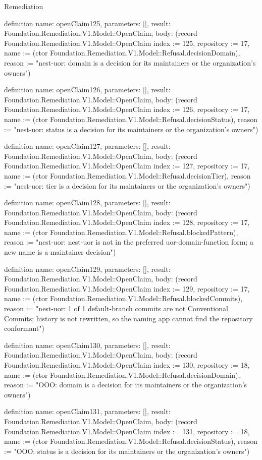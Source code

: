 \begin{lexlean}{Remediation}
\begin{semanticmodule}
definition{
  name: openClaim125,
  parameters: [],
  result: Foundation.Remediation.V1.Model::OpenClaim,
  body: (record Foundation.Remediation.V1.Model::OpenClaim {index := 125, repository := 17, name := (ctor Foundation.Remediation.V1.Model::Refusal.decisionDomain), reason := "nest-uor: domain is a decision for its maintainers or the organization's owners"})
}

definition{
  name: openClaim126,
  parameters: [],
  result: Foundation.Remediation.V1.Model::OpenClaim,
  body: (record Foundation.Remediation.V1.Model::OpenClaim {index := 126, repository := 17, name := (ctor Foundation.Remediation.V1.Model::Refusal.decisionStatus), reason := "nest-uor: status is a decision for its maintainers or the organization's owners"})
}

definition{
  name: openClaim127,
  parameters: [],
  result: Foundation.Remediation.V1.Model::OpenClaim,
  body: (record Foundation.Remediation.V1.Model::OpenClaim {index := 127, repository := 17, name := (ctor Foundation.Remediation.V1.Model::Refusal.decisionTier), reason := "nest-uor: tier is a decision for its maintainers or the organization's owners"})
}

definition{
  name: openClaim128,
  parameters: [],
  result: Foundation.Remediation.V1.Model::OpenClaim,
  body: (record Foundation.Remediation.V1.Model::OpenClaim {index := 128, repository := 17, name := (ctor Foundation.Remediation.V1.Model::Refusal.blockedPattern), reason := "nest-uor: nest-uor is not in the preferred uor-{domain}-{function} form; a new name is a maintainer decision"})
}

definition{
  name: openClaim129,
  parameters: [],
  result: Foundation.Remediation.V1.Model::OpenClaim,
  body: (record Foundation.Remediation.V1.Model::OpenClaim {index := 129, repository := 17, name := (ctor Foundation.Remediation.V1.Model::Refusal.blockedCommits), reason := "nest-uor: 1 of 1 default-branch commits are not Conventional Commits; history is not rewritten, so the naming app cannot find the repository conformant"})
}

definition{
  name: openClaim130,
  parameters: [],
  result: Foundation.Remediation.V1.Model::OpenClaim,
  body: (record Foundation.Remediation.V1.Model::OpenClaim {index := 130, repository := 18, name := (ctor Foundation.Remediation.V1.Model::Refusal.decisionDomain), reason := "OOO: domain is a decision for its maintainers or the organization's owners"})
}

definition{
  name: openClaim131,
  parameters: [],
  result: Foundation.Remediation.V1.Model::OpenClaim,
  body: (record Foundation.Remediation.V1.Model::OpenClaim {index := 131, repository := 18, name := (ctor Foundation.Remediation.V1.Model::Refusal.decisionStatus), reason := "OOO: status is a decision for its maintainers or the organization's owners"})
}


\end{semanticmodule}
\end{lexlean}

